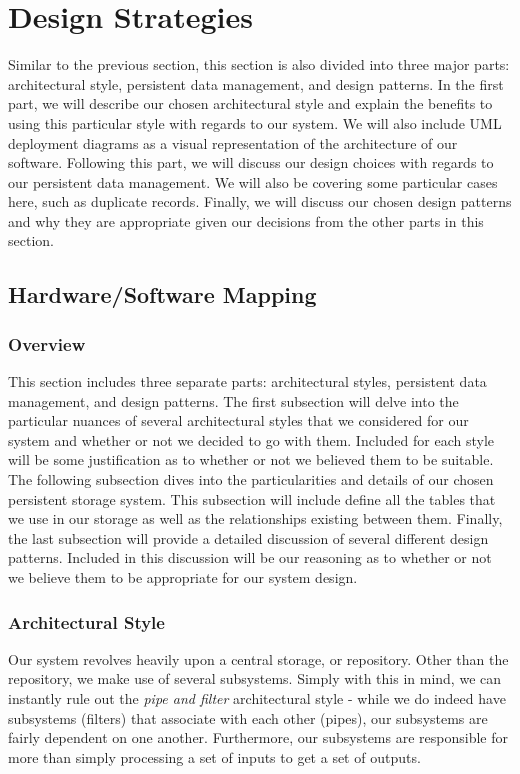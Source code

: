 \documentclass[12pt,letterpaper]{article}
\begin{document}
\section{Design Strategies}

Similar to the previous section, this section is also divided into three major parts: architectural style, persistent data management, and design patterns. In the first part, we will describe our chosen architectural style and explain the benefits to using this particular style with regards to our system. We will also include UML deployment diagrams as a visual representation of the architecture of our software. Following this part, we will discuss our design choices with regards to our persistent data management. We will also be covering some particular cases here, such as duplicate records. Finally, we will discuss our chosen design patterns and why they are appropriate given our decisions from the other parts in this section.

\subsection{Hardware/Software Mapping}
\subsubsection{Overview}

This section includes three separate parts: architectural styles, persistent data management, and design patterns. The first subsection will delve into the particular nuances of several architectural styles that we considered for our system and whether or not we decided to go with them. Included for each style will be some justification as to whether or not we believed them to be suitable. The following subsection dives into the particularities and details of our chosen persistent storage system. This subsection will include define all the tables that we use in our storage as well as the relationships existing between them. Finally, the last subsection will provide a detailed discussion of several different design patterns. Included in this discussion will be our reasoning as to whether or not we believe them to be appropriate for our system design. 

\subsubsection{Architectural Style}

Our system revolves heavily upon a central storage, or repository. Other than the repository, we make use of several subsystems. Simply with this in mind, we can instantly rule out the {\it pipe and filter} architectural style - while we do indeed have subsystems (filters) that associate with each other (pipes), our subsystems are fairly dependent on one another. Furthermore, our subsystems are responsible for more than simply processing a set of inputs to get a set of outputs. 
\end{document}
